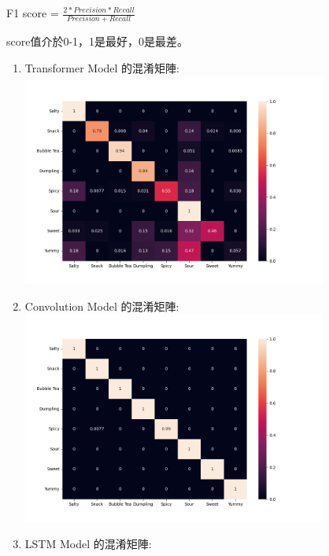 \documentclass[12pt,a4paper]{report}
\begin{document}
\begin{CJK*}{UTF8}{bkai}
\begin{enumerate}
\begin{Large}
                  F1 score =
                  \begin{math}
                      \frac{2*Precision*Recall}{Precision+Recall}
                  \end{math}
              \end{Large}
              \par
              score值介於0-1，1是最好，0是最差。
              \newpage
              \begin{enumerate}
                  \item Transformer Model 的混淆矩陣:\\
                        \includegraphics[width=100mm]{Transformer_vector_confusion_matrix.png}
                  \item Convolution Model 的混淆矩陣:\\
                        \includegraphics[width=100mm]{Convolution_confusion_matrix.png}
                  \item LSTM Model 的混淆矩陣:\\

\end{enumerate}
\end{enumerate}
\end{CJK*}
\end{document}
